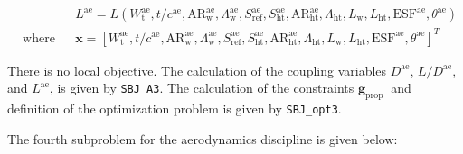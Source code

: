 \documentclass[11pt]{article}
\begin{document}
\begin{equation*}
\begin{aligned}
    & & & L^{\mathrm{ae}}=L\left(W_{\mathrm{t}}^{\mathrm{ae}}, t / c^{\mathrm{ae}}, \mathrm{AR}_{\mathrm{w}}^{\mathrm{ae}}, \Lambda_{\mathrm{w}}^{\mathrm{ae}}, S_{\mathrm{ref}}^{\mathrm{ae}}, S_{\mathrm{ht}}^{\mathrm{ae}}, \mathrm{AR}_{\mathrm{ht}}^{\mathrm{ae}}, \Lambda_{\mathrm{ht}}, L_{\mathrm{w}}, L_{\mathrm{ht}}, \mathrm{ESF}^{\mathrm{ae}}, \theta^{\mathrm{ae}}\right)\\
    & \text{where}
        & & \mathbf{x} = \left[W_{\mathrm{t}}^{\mathrm{ae}}, t / c^{\mathrm{ae}}, \mathrm{AR}_{\mathrm{w}}^{\mathrm{ae}}, \Lambda_{\mathrm{w}}^{\mathrm{ae}}, S_{\mathrm{ref}}^{\mathrm{ae}}, S_{\mathrm{ht}}^{\mathrm{ae}}, \mathrm{AR}_{\mathrm{ht}}^{\mathrm{ae}}, \Lambda_{\mathrm{ht}}, L_{\mathrm{w}}, L_{\mathrm{ht}}, \mathrm{ESF}^{\mathrm{ae}}, \theta^{\mathrm{ae}}\right]^\textit{T}
    \end{aligned}
\end{equation*}

There is no local objective. The calculation of the coupling variables
\(D^{\mathrm{ae}}\), \(L / D^{\mathrm{ae}}\), and \(L^{\mathrm{ae}}\),
is given by \texttt{SBJ\_A3}. The calculation of the constraints
\(\mathbf{g}_{\text {prop }}\) and definition of the optimization
problem is given by \texttt{SBJ\_opt3}.

The fourth subproblem for the aerodynamics discipline is given below:
\end{document}
